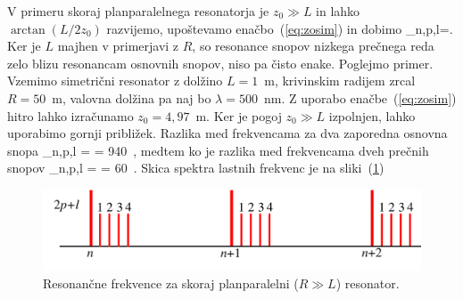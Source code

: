 V primeru skoraj planparalelnega 
resonatorja je $z_{0}\gg L$ in lahko
$\arctan(L/2z_{0})$ razvijemo, upoštevamo enačbo~(\ref{eq:zosim}) in dobimo
\beq
\omega_{n,p,l}=.
\eeq
Ker je $L$ majhen v primerjavi z $R$, so resonance snopov nizkega prečnega reda 
zelo blizu resonancam osnovnih snopov, niso pa čisto enake. Poglejmo primer. Vzemimo 
simetrični resonator z dolžino $L=1$~m, krivinskim radijem zrcal $R=50$~m, 
valovna dolžina pa naj bo $\lambda= 500$~nm. Z uporabo enačbe~(\ref{eq:zosim})
hitro lahko izračunamo $z_0 = 4,97$~m. Ker je pogoj $z_0\gg L$ izpolnjen, lahko uporabimo
gornji približek. Razlika med frekvencama za dva zaporedna osnovna snopa 
\beq
\Delta \omega_{n,p,l} =  = 940~,
\eeq
medtem ko je razlika med frekvencama dveh prečnih snopov
\beq
\Delta \omega_{n,p,l} =   = 60~.
\eeq
Skica spektra lastnih frekvenc je na sliki~(\ref{fig:crte})
\begin{figure}[h]
\centering
\includegraphics[width=10truecm]{slike/04_crte.png}
\caption{Resonančne frekvence za skoraj planparalelni ($R\gg L$) resonator.}
\label{fig:crte}
\end{figure}

